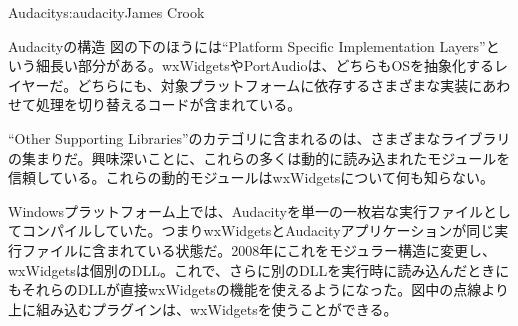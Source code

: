 \begin{aosachapter}{Audacity}{s:audacity}{James Crook}
\begin{aosasect1}{Audacityの構造}
図の下のほうには``Platform Specific Implementation Layers''という細長い部分がある。wxWidgetsやPortAudioは、どちらもOSを抽象化するレイヤーだ。どちらにも、対象プラットフォームに依存するさまざまな実装にあわせて処理を切り替えるコードが含まれている。

``Other Supporting Libraries''のカテゴリに含まれるのは、さまざまなライブラリの集まりだ。興味深いことに、これらの多くは動的に読み込まれたモジュールを信頼している。これらの動的モジュールはwxWidgetsについて何も知らない。

Windowsプラットフォーム上では、Audacityを単一の一枚岩な実行ファイルとしてコンパイルしていた。つまりwxWidgetsとAudacityアプリケーションが同じ実行ファイルに含まれている状態だ。2008年にこれをモジュラー構造に変更し、wxWidgetsは個別のDLL。これで、さらに別のDLLを実行時に読み込んだときにもそれらのDLLが直接wxWidgetsの機能を使えるようになった。図中の点線より上に組み込むプラグインは、wxWidgetsを使うことができる。


\end{aosasect1}
\end{aosachapter}
